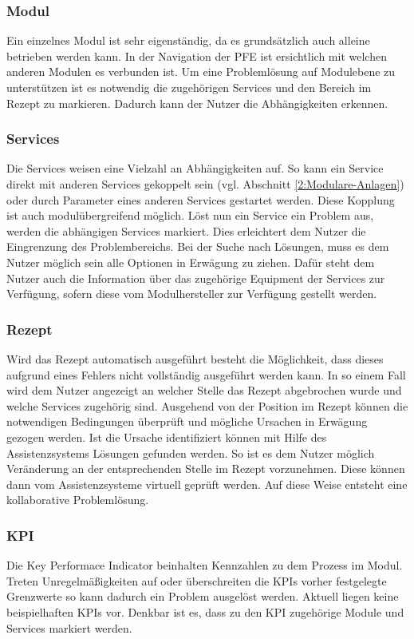 \subsubsection*{Modul}
Ein einzelnes Modul ist sehr eigenständig, da es grundsätzlich auch alleine betrieben werden kann. In der Navigation der PFE ist ersichtlich mit welchen anderen Modulen es verbunden ist. Um eine Problemlösung auf Modulebene zu unterstützen ist es notwendig die zugehörigen Services und den Bereich im Rezept zu markieren. Dadurch kann der Nutzer die Abhängigkeiten erkennen. 

\subsubsection*{Services}
Die Services weisen eine Vielzahl an Abhängigkeiten auf. So kann ein Service direkt mit anderen Services gekoppelt sein (vgl. Abschnitt \ref{2:Modulare-Anlagen}) oder durch Parameter eines anderen Services gestartet werden. Diese Kopplung ist auch modulübergreifend möglich. Löst nun ein Service ein Problem aus, werden die abhängigen Services markiert. Dies erleichtert dem Nutzer die Eingrenzung des Problembereichs. Bei der Suche nach Lösungen, muss es dem Nutzer möglich sein alle Optionen in Erwägung zu ziehen. Dafür steht dem Nutzer auch die Information über das zugehörige Equipment der Services zur Verfügung, sofern diese vom Modulhersteller zur Verfügung gestellt werden.

\subsubsection*{Rezept}
Wird das Rezept automatisch ausgeführt besteht die Möglichkeit, dass dieses aufgrund eines Fehlers nicht vollständig ausgeführt werden kann. In so einem Fall wird dem Nutzer angezeigt an welcher Stelle das Rezept abgebrochen wurde und welche Services zugehörig sind. Ausgehend von der Position im Rezept können die notwendigen Bedingungen überprüft und mögliche Ursachen in Erwägung gezogen werden. Ist die Ursache identifiziert können mit Hilfe des Assistenzsystems Lösungen gefunden werden. So ist es dem Nutzer möglich Veränderung an der entsprechenden Stelle im Rezept vorzunehmen. Diese können dann vom Assistenzsysteme virtuell geprüft werden. Auf diese Weise entsteht eine kollaborative Problemlösung.  

\subsubsection*{KPI}
Die Key Performace Indicator beinhalten Kennzahlen zu dem Prozess im Modul. Treten Unregelmäßigkeiten auf oder überschreiten die KPIs vorher festgelegte Grenzwerte so kann dadurch ein Problem ausgelöst werden. Aktuell liegen keine beispielhaften KPIs vor. Denkbar ist es, dass zu den KPI zugehörige Module und Services markiert werden.

